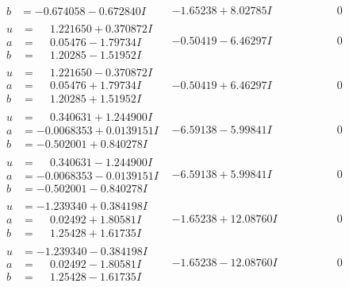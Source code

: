 \documentclass[1p]{elsarticle_modified}
\theoremstyle{definition}
\begin{document}
$$\begin{array}{c|c|c}
\begin{aligned}
b &= -0.674058 - 0.672840 I\end{aligned}
 & -1.65238 + 8.02785 I & \phantom{-0.000000 } 0 \\ \hline\begin{aligned}
u &= \phantom{-}1.221650 + 0.370872 I \\
a &= \phantom{-}0.05476 - 1.79734 I \\
b &= \phantom{-}1.20285 - 1.51952 I\end{aligned}
 & -0.50419 - 6.46297 I & \phantom{-0.000000 } 0 \\ \hline\begin{aligned}
u &= \phantom{-}1.221650 - 0.370872 I \\
a &= \phantom{-}0.05476 + 1.79734 I \\
b &= \phantom{-}1.20285 + 1.51952 I\end{aligned}
 & -0.50419 + 6.46297 I & \phantom{-0.000000 } 0 \\ \hline\begin{aligned}
u &= \phantom{-}0.340631 + 1.244900 I \\
a &= -0.0068353 + 0.0139151 I \\
b &= -0.502001 + 0.840278 I\end{aligned}
 & -6.59138 - 5.99841 I & \phantom{-0.000000 } 0 \\ \hline\begin{aligned}
u &= \phantom{-}0.340631 - 1.244900 I \\
a &= -0.0068353 - 0.0139151 I \\
b &= -0.502001 - 0.840278 I\end{aligned}
 & -6.59138 + 5.99841 I & \phantom{-0.000000 } 0 \\ \hline\begin{aligned}
u &= -1.239340 + 0.384198 I \\
a &= \phantom{-}0.02492 + 1.80581 I \\
b &= \phantom{-}1.25428 + 1.61735 I\end{aligned}
 & -1.65238 + 12.08760 I & \phantom{-0.000000 } 0 \\ \hline\begin{aligned}
u &= -1.239340 - 0.384198 I \\
a &= \phantom{-}0.02492 - 1.80581 I \\
b &= \phantom{-}1.25428 - 1.61735 I\end{aligned}
 & -1.65238 - 12.08760 I & \phantom{-0.000000 } 0 \\ \hline\begin{aligned}

\end{aligned}
\end{array}$$
\end{document}
